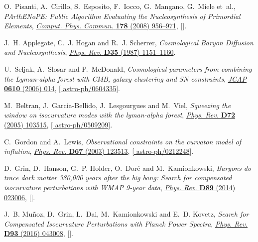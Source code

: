 \documentclass[11pt,a4paper]{article}
\begin{document}
\begin{thebibliography}{10}
O.~Pisanti, A.~Cirillo, S.~Esposito, F.~Iocco, G.~Mangano, G.~Miele et~al.,
  \emph{{PArthENoPE: Public Algorithm Evaluating the Nucleosynthesis of
  Primordial Elements}},
  \href{https://doi.org/10.1016/j.cpc.2008.02.015}{\emph{Comput. Phys. Commun.}
  {\bfseries 178} (2008) 956--971},
  [\href{https://arxiv.org/abs/0705.0290}{{}}].

J.~H. Applegate, C.~J. Hogan and R.~J. Scherrer, \emph{{Cosmological Baryon
  Diffusion and Nucleosynthesis}},
  \href{https://doi.org/10.1103/PhysRevD.35.1151}{\emph{Phys. Rev.} {\bfseries
  D35} (1987) 1151--1160}.

U.~Seljak, A.~Slosar and P.~McDonald, \emph{{Cosmological parameters from
  combining the Lyman-alpha forest with CMB, galaxy clustering and SN
  constraints}},
  \href{https://doi.org/10.1088/1475-7516/2006/10/014}{\emph{JCAP} {\bfseries
  0610} (2006) 014}, [\href{https://arxiv.org/abs/astro-ph/0604335}{{\ttfamily
  astro-ph/0604335}}].

M.~Beltran, J.~Garcia-Bellido, J.~Lesgourgues and M.~Viel, \emph{{Squeezing the
  window on isocurvature modes with the lyman-alpha forest}},
  \href{https://doi.org/10.1103/PhysRevD.72.103515}{\emph{Phys. Rev.}
  {\bfseries D72} (2005) 103515},
  [\href{https://arxiv.org/abs/astro-ph/0509209}{{\ttfamily
  astro-ph/0509209}}].

C.~Gordon and A.~Lewis, \emph{{Observational constraints on the curvaton model
  of inflation}}, \href{https://doi.org/10.1103/PhysRevD.67.123513}{\emph{Phys.
  Rev.} {\bfseries D67} (2003) 123513},
  [\href{https://arxiv.org/abs/astro-ph/0212248}{{\ttfamily
  astro-ph/0212248}}].

D.~Grin, D.~Hanson, G.~P. Holder, O.~Dor{\'e} and M.~Kamionkowski, \emph{{Baryons
  do trace dark matter 380,000 years after the big bang: Search for compensated
  isocurvature perturbations with WMAP 9-year data}},
  \href{https://doi.org/10.1103/PhysRevD.89.023006}{\emph{Phys. Rev.}
  {\bfseries D89} (2014) 023006},
  [\href{https://arxiv.org/abs/1306.4319}{{}}].

J.~B. Mu{\~n}oz, D.~Grin, L.~Dai, M.~Kamionkowski and E.~D. Kovetz, \emph{{Search
  for Compensated Isocurvature Perturbations with Planck Power Spectra}},
  \href{https://doi.org/10.1103/PhysRevD.93.043008}{\emph{Phys. Rev.}
  {\bfseries D93} (2016) 043008},
  [\href{https://arxiv.org/abs/1511.04441}{{}}].


\end{thebibliography}
\end{document}

